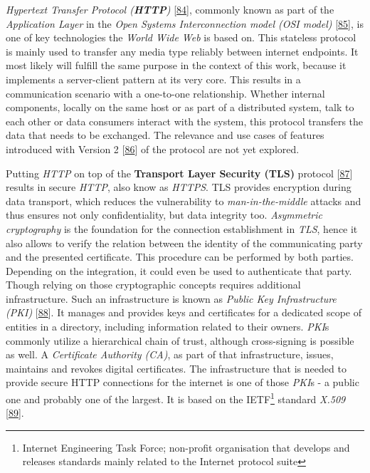 \documentclass[12pt,english,a4paper,titlepage,cleardoublepage=empty,dottedtoc]{report}
\begin{document}
\emph{Hypertext Transfer Protocol
(\textbf{\protect\hypertarget{def--http}{}{HTTP}})}
{[}\protect\hyperlink{ref-web_spec_http1}{84}{]}, commonly known as part
of the \emph{Application Layer} in the \emph{Open Systems
Interconnection model (OSI model)}
{[}\protect\hyperlink{ref-web_2017_wikipedia_osi-model}{85}{]}, is one
of key technologies the \emph{World Wide Web} is based on. This
stateless protocol is mainly used to transfer any media type reliably
between internet endpoints. It most likely will fulfill the same purpose
in the context of this work, because it implements a server-client
pattern at its very core. This results in a communication scenario with
a one-to-one relationship. Whether internal components, locally on the
same host or as part of a distributed system, talk to each other or data
consumers interact with the system, this protocol transfers the data
that needs to be exchanged. The relevance and use cases of features
introduced with Version 2
{[}\protect\hyperlink{ref-web_spec_http2}{86}{]} of the protocol are not
yet explored.

Putting \emph{HTTP} on top of the \textbf{Transport Layer Security
(TLS)} protocol {[}\protect\hyperlink{ref-web_spec_tls}{87}{]} results
in secure \emph{HTTP}, also know as
\emph{\protect\hypertarget{def--https}{}{HTTPS}}. TLS provides
encryption during data transport, which reduces the vulnerability to
\emph{man-in-the-middle} attacks and thus ensures not only
confidentiality, but data integrity too. \emph{Asymmetric cryptography}
is the foundation for the connection establishment in \emph{TLS}, hence
it also allows to verify the relation between the identity of the
communicating party and the presented certificate. This procedure can be
performed by both parties. Depending on the integration, it could even
be used to authenticate that party. Though relying on those
cryptographic concepts requires additional infrastructure. Such an
infrastructure is known as \emph{Public Key Infrastructure (PKI)}
{[}\protect\hyperlink{ref-book_2014_chapter-14-5-pki}{88}{]}. It manages
and provides keys and certificates for a dedicated scope of entities in
a directory, including information related to their owners. \emph{PKI}s
commonly utilize a hierarchical chain of trust, although cross-signing
is possible as well. A \emph{Certificate Authority (CA)}, as part of
that infrastructure, issues, maintains and revokes digital certificates.
The infrastructure that is needed to provide secure HTTP connections for
the internet is one of those \emph{PKI}s - a public one and probably one
of the largest. It is based on the IETF\footnote{Internet Engineering
  Task Force; non-profit organisation that develops and releases
  standards mainly related to the Internet protocol suite} standard
\emph{X.509} {[}\protect\hyperlink{ref-web_spec_x509}{89}{]}.
\end{document}
